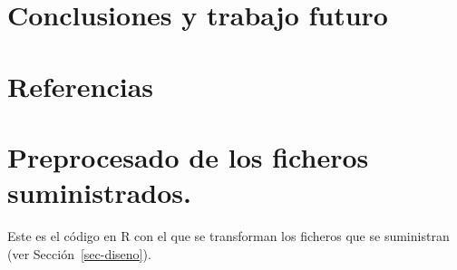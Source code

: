 \documentclass[
  12pt,
  a4paper,
  extrafontsizes,
  onecolumn,
  openright]{memoir}
\begin{document}

\hypertarget{conclusiones}{%
\chapter{Conclusiones y trabajo futuro}\label{conclusiones}}


\hypertarget{referencias}{%
\chapter*{Referencias}\label{referencias}}


\printbibliography[heading=none]

\cleardoublepage
{}
{}
\appendix

\hypertarget{sec-preprocess}{%
\chapter{Preprocesado de los ficheros
suministrados.}\label{sec-preprocess}}

Este es el código en R con el que se transforman los ficheros que se
suministran (ver Sección~\ref{sec-diseno}).

\footnotesize
\end{document}
